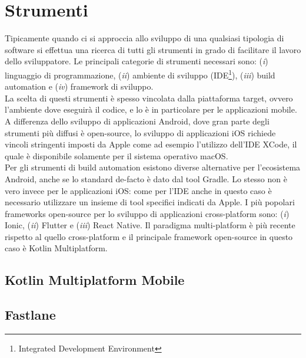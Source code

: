 \section{Strumenti}
Tipicamente quando ci si approccia allo sviluppo di una qualsiasi tipologia di software si effettua una ricerca di tutti gli strumenti in grado di facilitare il lavoro dello sviluppatore. Le principali categorie di strumenti necessari sono: (\textit{i}) linguaggio di programmazione, (\textit{ii}) ambiente di sviluppo (IDE\footnote{Integrated Development Environment}), (\textit{iii}) build automation e (\textit{iv}) framework di sviluppo.\\
La scelta di questi strumenti è spesso vincolata dalla piattaforma target, ovvero l'ambiente dove eseguirà il codice, e lo è in particolare per le applicazioni mobile. A differenza dello sviluppo di applicazioni Android, dove gran parte degli strumenti più diffusi è open-source, lo sviluppo di applicazioni iOS richiede vincoli stringenti imposti da Apple come ad esempio l'utilizzo dell'IDE XCode, il quale è disponibile solamente per il sistema operativo macOS.\\
Per gli strumenti di build automation esistono diverse alternative per l'ecosistema Android, anche se lo standard de-facto è dato dal tool Gradle. Lo stesso non è vero invece per le applicazioni iOS: come per l'IDE anche in questo caso è necessario utilizzare un insieme di tool specifici indicati da Apple. I più popolari frameworks open-source per lo sviluppo di applicazioni cross-platform sono: (\textit{i}) Ionic, (\textit{ii}) Flutter e (\textit{iii}) React Native. Il paradigma multi-platform è più recente rispetto al quello cross-platform e il principale framework open-source in questo caso è Kotlin Multiplatform.

\subsection{Kotlin Multiplatform Mobile}

\subsection{Fastlane}
